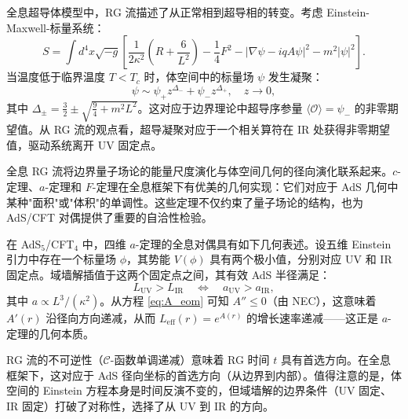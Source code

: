 \begin{example}[全息超导体]\label{ex:holographic_sc}
全息超导体模型中，RG 流描述了从正常相到超导相的转变。考虑 Einstein-Maxwell-标量系统：
\begin{equation}
    S = \int d^4x\sqrt{-g}\left[\frac{1}{2\kappa^2}\left(R + \frac{6}{L^2}\right) - \frac{1}{4}F^2 - |\nabla\psi - iqA\psi|^2 - m^2|\psi|^2\right].
\end{equation}
当温度低于临界温度 $T < T_c$ 时，体空间中的标量场 $\psi$ 发生凝聚：
\begin{equation}
    \psi \sim \psi_+ z^{\Delta_-} + \psi_- z^{\Delta_+}, \quad z \to 0,
\end{equation}
其中 $\Delta_\pm = \frac{3}{2} \pm \sqrt{\frac{9}{4} + m^2L^2}$。这对应于边界理论中超导序参量 $\langle\mathcal{O}\rangle = \psi_-$ 的非零期望值。从 RG 流的观点看，超导凝聚对应于一个相关算符在 IR 处获得非零期望值，驱动系统离开 UV 固定点。
\end{example}

\begin{note}[总结与展望]
全息 RG 流将边界量子场论的能量尺度演化与体空间几何的径向演化联系起来。$c$-定理、$a$-定理和 $F$-定理在全息框架下有优美的几何实现：它们对应于 AdS 几何中某种"面积"或"体积"的单调性。这些定理不仅约束了量子场论的结构，也为 AdS/CFT 对偶提供了重要的自洽性检验。
\end{note}

\begin{remark}[全息 $a$-定理的几何实现]\label{rem:holo_a_theorem}
在 AdS$_5$/CFT$_4$ 中，四维 $a$-定理的全息对偶具有如下几何表述。设五维 Einstein 引力中存在一个标量场 $\phi$，其势能 $V(\phi)$ 具有两个极小值，分别对应 UV 和 IR 固定点。域墙解插值于这两个固定点之间，其有效 AdS 半径满足：
\begin{equation}
    L_{\text{UV}} > L_{\text{IR}} \quad \Longleftrightarrow \quad a_{\text{UV}} > a_{\text{IR}},
\end{equation}
其中 $a \propto L^3/(\kappa^2)$。从方程 \eqref{eq:A_eom} 可知 $A'' \leq 0$（由 NEC），这意味着 $A'(r)$ 沿径向方向递减，从而 $L_{\text{eff}}(r) = e^{A(r)}$ 的增长速率递减——这正是 $a$-定理的几何本质。
\end{remark}

\begin{proposition}[RG 流的不可逆性与时间反演对称性破缺]\label{prop:irreversibility}
RG 流的不可逆性（$\mathcal{C}$-函数单调递减）意味着 RG 时间 $t$ 具有首选方向。在全息框架下，这对应于 AdS 径向坐标的首选方向（从边界到内部）。值得注意的是，体空间的 Einstein 方程本身是时间反演不变的，但域墙解的边界条件（UV 固定、IR 固定）打破了对称性，选择了从 UV 到 IR 的方向。
\end{proposition}

